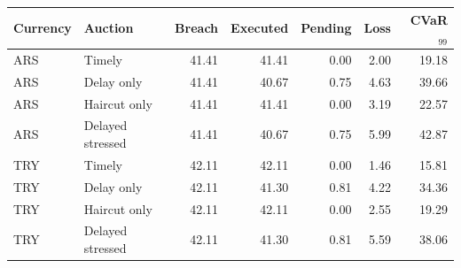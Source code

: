 \begin{tabular}{llrrrrr}
\toprule
Currency & Auction & Breach & Executed & Pending & Loss & CVaR$_{99}$ \\
\midrule
ARS & Timely & 41.41 & 41.41 & 0.00 & 2.00 & 19.18 \\
ARS & Delay only & 41.41 & 40.67 & 0.75 & 4.63 & 39.66 \\
ARS & Haircut only & 41.41 & 41.41 & 0.00 & 3.19 & 22.57 \\
ARS & Delayed stressed & 41.41 & 40.67 & 0.75 & 5.99 & 42.87 \\
TRY & Timely & 42.11 & 42.11 & 0.00 & 1.46 & 15.81 \\
TRY & Delay only & 42.11 & 41.30 & 0.81 & 4.22 & 34.36 \\
TRY & Haircut only & 42.11 & 42.11 & 0.00 & 2.55 & 19.29 \\
TRY & Delayed stressed & 42.11 & 41.30 & 0.81 & 5.59 & 38.06 \\
\bottomrule
\end{tabular}
